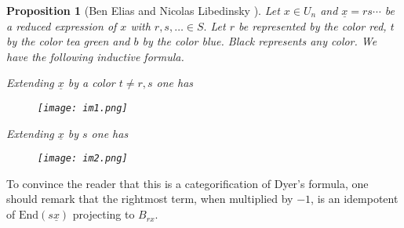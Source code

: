 \documentclass[12pt]{wart}
\newtheorem{prop}[thm]{Proposition}
\theoremstyle{remark}
\begin{document}
\begin{prop}[Ben Elias and Nicolas Libedinsky ] Let $x\in U_n$ and $\underline{x}=rs\cdots $ be a reduced expression of $x$ with $r, s, \ldots \in S.$  Let $r$ be represented by the color red, $t$ by the color tea green  and $b$ by the color blue. Black represents any color.  We have the following inductive formula. 

Extending $\underline{x}$ by a color $t\neq r, s$ one has 
 \begin{figure}[H] 
\begin{center}
 \texttt{[image: im1.png]}   
\end{center}
\end{figure} 
Extending $\underline{x}$ by $s$  one has 
 \begin{figure}[H] 
\begin{center}
 \texttt{[image: im2.png]}   
\end{center}
\end{figure} 
\end{prop}

To convince the reader that this is a categorification of Dyer's formula, one should remark that the rightmost term, when multiplied by $-1$, is an idempotent of $\mathrm{End}(s\underline{x})$ projecting to $B_{rx}$.
\end{document}
